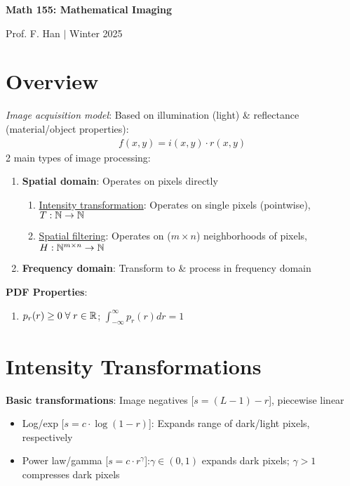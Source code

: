 \documentclass[12pt]{extarticle}
\begin{document}

\begin{center}
    \begin{Large}
        \textbf{Math 155: Mathematical Imaging}
    \end{Large}
    
    \begin{large}
        \vspace{8pt}
        Prof. F. Han $\vert$ Winter 2025
    \end{large}
\end{center}
\tableofcontents


\newpage
\section{Overview}
\textit{Image acquisition model}: Based on illumination (light) \& reflectance (material/object properties): \begin{align*}
    f(x,y)=i(x,y)\cdot r(x,y)
\end{align*}
2 main types of image processing: \begin{enumerate}
    \item \textbf{Spatial domain}: Operates on pixels directly \begin{enumerate}
        \item \ul{Intensity transformation}: Operates on single pixels (pointwise), $T:\mathbb{N}\to\mathbb{N}$
        \item \ul{Spatial filtering}: Operates on ($m\times n$) neighborhoods of pixels, $H:\mathbb{N}^{m\times n}\to\mathbb{N}$
    \end{enumerate}
    \item \textbf{Frequency domain}: Transform to \& process in frequency domain
\end{enumerate}
\textbf{PDF Properties}: \begin{enumerate}
    \item $p_r(r)\geq0\;\forall\;r\in\mathbb{R}$; $\int_{-\infty}^\infty p_r(r)dr=1$
\end{enumerate}

\section{Intensity Transformations}
\textbf{Basic transformations}: Image negatives [$s=(L-1)-r$], piecewise linear \begin{itemize}
    \item Log/exp [$s=c\cdot\log(1-r)$]: Expands range of dark/light pixels, respectively
    \item Power law/gamma [$s=c\cdot r^\gamma$]:$\gamma\in(0,1)$ expands dark pixels; $\gamma>1$ compresses dark pixels
\end{itemize}
\end{document}
